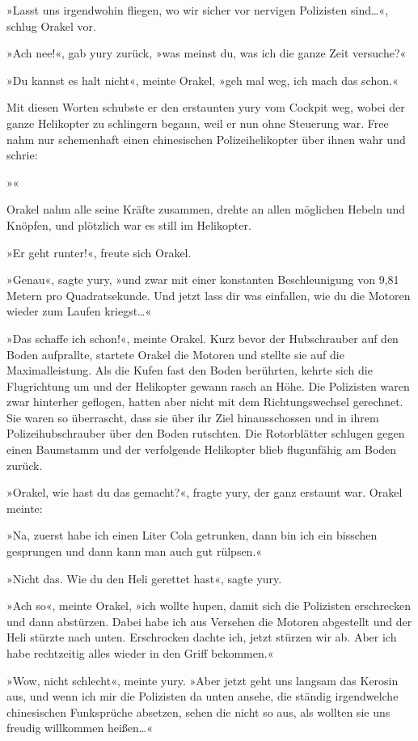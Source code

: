 »Lasst uns irgendwohin fliegen, wo wir sicher vor nervigen Polizisten sind…«, schlug Orakel vor.

»Ach nee!«, gab yury zurück, »was meinst du, was ich die ganze Zeit versuche?«

»Du kannst es halt nicht«, meinte Orakel, »geh mal weg, ich mach das schon.«

Mit diesen Worten schubste er den erstaunten yury vom Cockpit weg, wobei der ganze Helikopter zu schlingern begann, weil er nun ohne Steuerung war. Free nahm nur schemenhaft einen chinesischen Polizeihelikopter über ihnen wahr und schrie:

»«

Orakel nahm alle seine Kräfte zusammen, drehte an allen möglichen Hebeln und Knöpfen, und plötzlich war es still im Helikopter.

»Er geht runter!«, freute sich Orakel.

»Genau«, sagte yury, »und zwar mit einer konstanten Beschleunigung von 9,81 Metern pro Quadratsekunde. Und jetzt lass dir was einfallen, wie du die Motoren wieder zum Laufen kriegst…«

»Das schaffe ich schon!«, meinte Orakel. Kurz bevor der Hubschrauber auf den Boden aufprallte, startete Orakel die Motoren und stellte sie auf die Maximalleistung. Als die Kufen fast den Boden berührten, kehrte sich die Flugrichtung um und der Helikopter gewann rasch an Höhe. Die Polizisten waren zwar hinterher geflogen, hatten aber nicht mit dem Richtungswechsel gerechnet. Sie waren so überrascht, dass sie über ihr Ziel hinausschossen und in ihrem Polizeihubschrauber über den Boden rutschten. Die Rotorblätter schlugen gegen einen Baumstamm und der verfolgende Helikopter blieb flugunfähig am Boden zurück.

»Orakel, wie hast du das gemacht?«, fragte yury, der ganz erstaunt war. Orakel meinte:

»Na, zuerst habe ich einen Liter Cola getrunken, dann bin ich ein bisschen gesprungen und dann kann man auch gut rülpsen.«

»Nicht das. Wie du den Heli gerettet hast«, sagte yury.

»Ach so«, meinte Orakel, »ich wollte hupen, damit sich die Polizisten erschrecken und dann abstürzen. Dabei habe ich aus Versehen die Motoren abgestellt und der Heli stürzte nach unten. Erschrocken dachte ich, jetzt stürzen wir ab. Aber ich habe rechtzeitig alles wieder in den Griff bekommen.«

»Wow, nicht schlecht«, meinte yury. »Aber jetzt geht uns langsam das Kerosin aus, und wenn ich mir die Polizisten da unten ansehe, die ständig irgendwelche chinesischen Funksprüche absetzen, sehen die nicht so aus, als wollten sie uns freudig willkommen heißen…«


